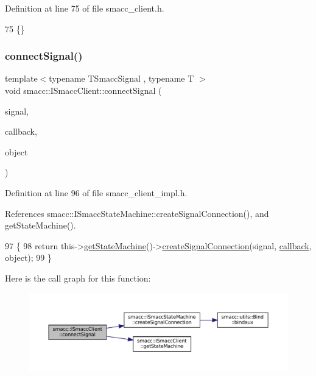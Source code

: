 Definition at line 75 of file smacc\+\_\+client.\+h.


\begin{DoxyCode}
75 \{\}
\end{DoxyCode}
\mbox{\label{classsmacc_1_1ISmaccClient_addce4ebcdebc5a7a3f80c0980862575d}} 
\subsubsection{\texorpdfstring{connect\+Signal()}{connectSignal()}}
{\footnotesize\ttfamily template$<$typename T\+Smacc\+Signal , typename T $>$ \\
void smacc\+::\+I\+Smacc\+Client\+::connect\+Signal (\begin{DoxyParamCaption}\item[{T\+Smacc\+Signal \&}]{signal,  }\item[{void(T\+::$\ast$)()}]{callback,  }\item[{T $\ast$}]{object }\end{DoxyParamCaption})}



Definition at line 96 of file smacc\+\_\+client\+\_\+impl.\+h.



References smacc\+::\+I\+Smacc\+State\+Machine\+::create\+Signal\+Connection(), and get\+State\+Machine().


\begin{DoxyCode}
97     \{
98         \textcolor{keywordflow}{return} this->\hyperlink{classsmacc_1_1ISmaccClient_aec51d4712404cb9882b86e4c854bb93a}{getStateMachine}()->\hyperlink{classsmacc_1_1ISmaccStateMachine_adf0f42ade0c65cc471960fe2a7c42da2}{createSignalConnection}(signal,
       \hyperlink{servers_2opencv__perception__node_2opencv__perception__node_8cpp_a050e697bd654facce10ea3f6549669b3}{callback}, \textcolor{keywordtype}{object});
99     \}
\end{DoxyCode}
Here is the call graph for this function\+:
\nopagebreak
\begin{figure}[H]
\begin{center}
\leavevmode
\includegraphics[width=350pt]{classsmacc_1_1ISmaccClient_addce4ebcdebc5a7a3f80c0980862575d_cgraph}
\end{center}
\end{figure}
\mbox{\label{classsmacc_1_1ISmaccClient_a5c1c8eb5e91a3b399662a52cb0ca86aa}} 
